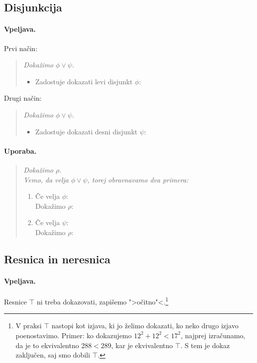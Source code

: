 \subsection{Disjunkcija}

\paragraph{Vpeljava.}
Prvi način:
%
\begin{quote}
  \sl
  Dokažimo $\phi \lor \psi$.
  \begin{itemize}
  \item[] Zadostuje dokazati levi disjunkt $\phi$: \quad {}
  \end{itemize}
\end{quote}
%
Drugi način:
%
\begin{quote}
  \sl
  Dokažimo $\phi \lor \psi$.
  \begin{itemize}
  \item[] Zadostuje dokazati desni disjunkt $\psi$: \quad {}
  \end{itemize}
\end{quote}

\paragraph{Uporaba.}
%
\begin{quote}
  \sl
  Dokažimo $\rho$.\\
  Vemo, da velja $\phi \lor \psi$, torej obravnavamo dva primera:\\
  \begin{enumerate}
  \item Če velja $\phi$: \\
        Dokažimo $\rho$: \quad {}
  \item Če velja $\psi$: \\
        Dokažimo $\rho$: \quad {}
  \end{enumerate}
\end{quote}

\subsection{Resnica in neresnica}

\paragraph{Vpeljava.}
Resnice $\top$ ni treba dokazovati, zapišemo ">očitno"<.\footnote{
V praksi $\top$ nastopi kot izjava, ki jo želimo dokazati, ko neko drugo izjavo poenostavimo. Primer: ko dokazujemo
$12^2 + 12^2 < 17^2$, najprej izračunamo, da je to ekvivalentno $288 < 289$, kar je ekvivalentno $\top$. S tem je dokaz
zaključen, saj smo dobili $\top$.}

